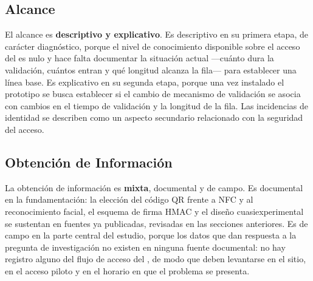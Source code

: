 \subsection{Alcance}
El alcance es \textbf{descriptivo y explicativo}. Es descriptivo en su primera
etapa, de carácter diagnóstico, porque el nivel de conocimiento disponible
sobre el acceso del \tescha{} es nulo y hace falta documentar la situación actual
—cuánto dura la validación, cuántos entran y qué longitud alcanza la fila—
para establecer una línea base. Es explicativo en su segunda
etapa, porque una vez instalado el prototipo se busca establecer si el cambio
de mecanismo de validación se asocia con cambios en el tiempo de validación
y la longitud de la fila. Las incidencias de identidad se describen como un
aspecto secundario relacionado con la seguridad del acceso.

\subsection{Obtención de Información}
La obtención de información es \textbf{mixta}, documental y de campo. Es
documental en la fundamentación: la elección del código QR frente a NFC y al
reconocimiento facial, el esquema de firma HMAC y el diseño cuasiexperimental
se sustentan en fuentes ya publicadas, revisadas en las secciones anteriores.
Es de campo en la parte central del estudio, porque los datos que dan
respuesta a la pregunta de investigación no existen en ninguna fuente
documental: no hay registro alguno del flujo de acceso del \tescha{}, de modo
que deben levantarse en el sitio, en el acceso piloto y en el horario en que
el problema se presenta.

